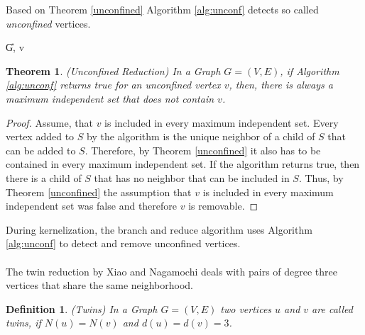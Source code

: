 \documentclass[]{article}
\newtheorem{theorem}{Theorem}
\newtheorem{definition}{Definition}
\begin{document}
Based on Theorem \ref{unconfined} Algorithm \ref{alg:unconf} detects so called \textit{unconfined} vertices.

\begin{algorithm}
	\caption{Unconfined -- Xiao and Nagamochi \cite{XiaoUnconfined}}\label{alg:unconf}
	\DontPrintSemicolon
	
	\U{G, v}	
	
	
\end{algorithm}


\begin{theorem}(Unconfined Reduction) In a Graph $G=(V,E)$, if Algorithm \ref{alg:unconf} returns true for an unconfined vertex $v$, then, there is always a maximum independent set that does not contain $v$.
\end{theorem}
\begin{proof}
	Assume, that $v$ is included in every maximum independent set. Every vertex added to $S$ by the algorithm is the unique neighbor of a child of $S$ that can be added to $S$. Therefore, by Theorem \ref{unconfined} it also has to be contained in every maximum independent set. If the algorithm returns true, then there is a child of $S$ that has no neighbor that can be included in $S$. Thus, by Theorem \ref{unconfined} the assumption that $v$ is included in every maximum independent set was false and therefore $v$ is removable.
\end{proof}
During kernelization, the branch and reduce algorithm uses Algorithm \ref{alg:unconf} to detect and remove unconfined vertices.\paragraph{}
The twin reduction by Xiao and Nagamochi \cite{XiaoUnconfined} deals with pairs of degree three vertices that share the same neighborhood.

\begin{definition}(Twins)
	In a Graph $G=(V,E)$ two vertices $u$ and $v$ are called twins, if $N(u) = N(v)$ and $d(u) = d(v) = 3$.
\end{definition}
\end{document}
